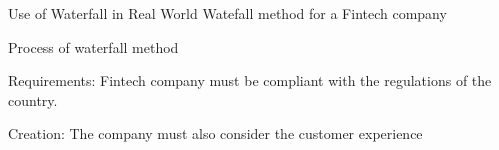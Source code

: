 \begin{frame}{Use of Waterfall in Real World}
Watefall method for a Fintech company
    \begin{alertblock}{Process of waterfall method}
        \item Requirements: Fintech company must be compliant with the regulations of the country.
        
        \item Creation: The company must also consider the customer experience
    \end{alertblock}
\end{frame}